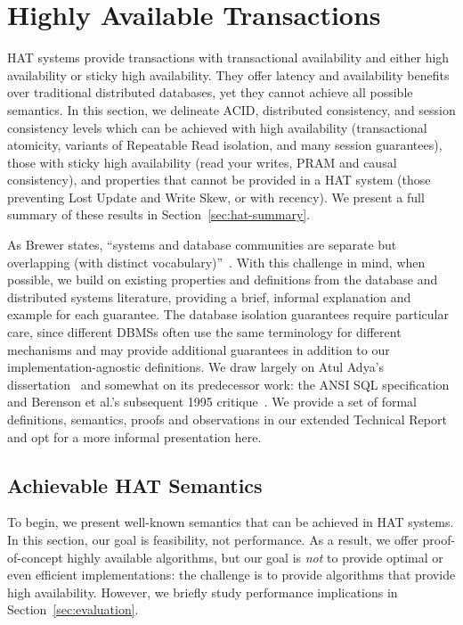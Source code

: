 
\section{Highly Available Transactions}
\label{sec:hats}

HAT systems provide transactions with transactional availability and
either high availability or sticky high availability. They offer
latency and availability benefits over traditional distributed
databases, yet they cannot achieve all possible semantics. In this
section, we delineate ACID, distributed consistency, and session
consistency levels which can be achieved with high availability
(transactional atomicity, variants of Repeatable Read isolation, and
many session guarantees), those with sticky high availability (read
your writes, PRAM and causal consistency), and properties that cannot
be provided in a HAT system (those preventing Lost Update and Write
Skew, or with recency).  We present a full summary of these results in
Section~\ref{sec:hat-summary}.

As Brewer states, ``systems and database communities are separate but
overlapping (with distinct vocabulary)''~\cite{brewer-slides}. With
this challenge in mind, when possible, we build on existing properties
and definitions from the database and distributed systems literature,
providing a brief, informal explanation and example for each
guarantee. The database isolation guarantees require particular care,
since different DBMSs often use the same terminology for different
mechanisms and may provide additional guarantees in addition to our
implementation-agnostic definitions.  We draw largely on Atul Adya's
dissertation~\cite{adya} and somewhat on its predecessor work: the
ANSI SQL specification~\cite{ansi-sql} and Berenson et al.'s
subsequent 1995 critique~\cite{ansicritique}. We provide a set of
formal definitions, semantics, proofs and observations in our extended
Technical Report~\cite{hat-tr} and opt for a more informal
presentation here.

\subsection{Achievable HAT Semantics}

To begin, we present well-known semantics that can be achieved in HAT
systems. In this section, our goal is feasibility, not performance. As
a result, we offer proof-of-concept highly available algorithms, but
our goal is \textit{not} to provide optimal or even efficient
implementations: the challenge is to provide algorithms that provide
high availability. However, we briefly study performance implications
in Section~\ref{sec:evaluation}.

